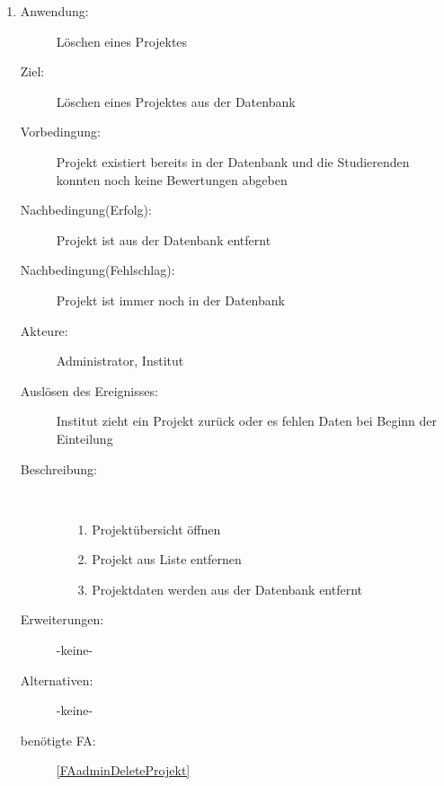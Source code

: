 \documentclass[parskip=full]{scrartcl}
\newcommand{\swtLabel}[1]{\textbf{/#1\arabic*0/}}
\begin{document}
\begin{enumerate} [label=\swtLabel{A}]
  
  \item \label{UCadminDeleteProjekt}
  \begin{description}
  \item[Anwendung:] Löschen eines Projektes
  \item[Ziel:] Löschen eines Projektes aus der Datenbank
  	\item[Vorbedingung:] Projekt existiert bereits in der Datenbank und die
  	Studierenden konnten noch keine Bewertungen abgeben
  	\item[Nachbedingung(Erfolg):] Projekt ist aus der Datenbank entfernt
  	\item[Nachbedingung(Fehlschlag):] Projekt ist immer noch in der Datenbank
  	\item[Akteure:] Administrator, Institut %
  	\item[Auslösen des Ereignisses:] Institut zieht ein Projekt zurück oder es
  	fehlen Daten bei Beginn der Einteilung
  	\item[Beschreibung:]~
  	\begin{enumerate} 
  	  \item[1.] Projektübersicht öffnen
  	  \item[2.] Projekt aus Liste entfernen
  	  \item[3.] Projektdaten werden aus der Datenbank entfernt
  	\end{enumerate}
  	\item[Erweiterungen:] -keine-
  	\item[Alternativen:] -keine-
  	\item[benötigte FA:] \ref{FAadminDeleteProjekt}
  \end{description}
   

\end{enumerate}
\end{document}

